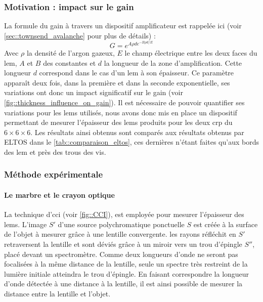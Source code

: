             \subsubsection{Motivation : impact sur le gain}
            
                La formule du gain à travers un dispositif amplificateur est rappelée ici (voir \autoref{sec::townsend_avalanche} pour plus de détails) :
                \begin{equation}\label{eq::townsend_avalanche_2}
                    G = e^{A\rho d e^{-B\rho d/E}}
                \end{equation}
                Avec $\rho$ la densité de l'argon gazeux, $E$ le champ électrique entre les deux faces du \gls{lem}, $A$ et $B$ des constantes et $d$ la longueur de la zone d'amplification. Cette longueur $d$ correspond dans le cas d'un \gls{lem} à son épaisseur. Ce paramètre apparaît deux fois, dans la première et dans la seconde exponentielle, ses variations ont donc un impact significatif sur le gain (voir \autoref{fig::thickness_influence_on_gain}). Il est nécessaire de pouvoir quantifier ses variations pour les \glspl{lem} utilisés, nous avons donc mis en place un dispositif permettant de mesurer l'épaisseur des \glspl{lem} produits pour les deux \gls{crp} du $6\times6\times6$. Les résultats ainsi obtenus sont comparés aux résultats obtenus par ELTOS dans le \autoref{tab::comparaison_eltos}, ces dernières n'étant faites qu'aux bords des \gls{lem} et près des trous des vis.
                
            \subsubsection{Méthode expérimentale}
                \paragraph{Le marbre et le crayon optique}
                
                    La technique d'\gls{cci} (voir \autoref{fig::CCI}), est employée pour mesurer l'épaisseur des \glspl{lem}. L'image $S'$ d'une source polychromatique ponctuelle $S$ est créée à la surface de l'objet à mesurer grâce à une lentille convergente. les rayons réfléchit en $S'$ retraversent la lentille et sont déviés grâce à un miroir vers un trou d'épingle $S''$, placé devant un spectromètre. Comme deux longueurs d'onde ne seront pas focalisées à la même distance de la lentille, seule un spectre très restreint de la lumière initiale atteindra le trou d'épingle. En faisant correspondre la longueur d'onde détectée à une distance à la lentille, il est ainsi possible de mesurer la distance entre la lentille et l'objet.%
                    
